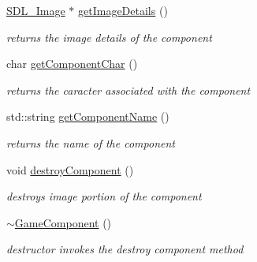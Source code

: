 \begin{DoxyCompactItemize}
\hypertarget{class_game_component_ac3ba1236d964b98b96ff5246ca759949}{}\label{class_game_component_ac3ba1236d964b98b96ff5246ca759949} 
\hyperlink{class_s_d_l___image}{S\+D\+L\+\_\+\+Image} $\ast$ \hyperlink{class_game_component_ac3ba1236d964b98b96ff5246ca759949}{get\+Image\+Details} ()
\begin{DoxyCompactList}\small\item\em returns the image details of the component \end{DoxyCompactList}\item 
\hypertarget{class_game_component_af35b353860f119e0729724129a9c5b7f}{}\label{class_game_component_af35b353860f119e0729724129a9c5b7f} 
char \hyperlink{class_game_component_af35b353860f119e0729724129a9c5b7f}{get\+Component\+Char} ()
\begin{DoxyCompactList}\small\item\em returns the caracter associated with the component \end{DoxyCompactList}\item 
\hypertarget{class_game_component_a272b091e7279497d6c14c5dfbd8cb989}{}\label{class_game_component_a272b091e7279497d6c14c5dfbd8cb989} 
std\+::string \hyperlink{class_game_component_a272b091e7279497d6c14c5dfbd8cb989}{get\+Component\+Name} ()
\begin{DoxyCompactList}\small\item\em returns the name of the component \end{DoxyCompactList}\item 
\hypertarget{class_game_component_af77731abc50adb4b200ddf5679984848}{}\label{class_game_component_af77731abc50adb4b200ddf5679984848} 
void \hyperlink{class_game_component_af77731abc50adb4b200ddf5679984848}{destroy\+Component} ()
\begin{DoxyCompactList}\small\item\em destroys image portion of the component \end{DoxyCompactList}\item 
\hypertarget{class_game_component_a6d4c3872b9603eb0673655c4b4c0b183}{}\label{class_game_component_a6d4c3872b9603eb0673655c4b4c0b183} 
\hyperlink{class_game_component_a6d4c3872b9603eb0673655c4b4c0b183}{$\sim$\+Game\+Component} ()
\begin{DoxyCompactList}\small\item\em destructor invokes the destroy component method \end{DoxyCompactList}\end{DoxyCompactItemize}
